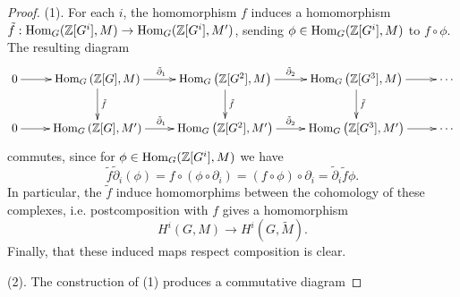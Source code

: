 \documentclass[11pt]{amsart}
\numberwithin{equation}{section}
\theoremstyle{remark}
\theoremstyle{remark}
\theoremstyle{remark}
\theoremstyle{definition}
\theoremstyle{definition}
\theoremstyle{definition}
\theoremstyle{definition}
\theoremstyle{definition}
\theoremstyle{definition}
\begin{document}
\begin{proof}
(1). For each $i$, the homomorphism $f$ induces a homomorphism $\tilde{f}:\textup{Hom}_G(\mathbb{Z}[G^i],M)\rightarrow \textup{Hom}_G(\mathbb{Z}[G^i],M')$, sending $\phi\in \textup{Hom}_G(\mathbb{Z}[G^i],M)$ to $f\circ \phi$. The resulting diagram 
\[
\xymatrix{0\ar[r]&\textup{Hom}_{G}\left(\mathbb{Z}[G],M\right)\ar[r]^{\tilde{\partial}_1}\ar[d]^{\tilde{f}}&\textup{Hom}_{G}\left(\mathbb{Z}[G^2],M\right)\ar[r]^{\tilde{\partial}_2}\ar[d]^{\tilde{f}}& \textup{Hom}_{G}\left(\mathbb{Z}[G^3],M\right)\ar[r]\ar[d]^{\tilde{f}}&\cdots \\ 0\ar[r]&\textup{Hom}_{G}\left(\mathbb{Z}[G],M'\right)\ar[r]^{\tilde{\partial}_1}&
\textup{Hom}_{G}\left(\mathbb{Z}[G^2],M'\right)\ar[r]^{\tilde{\partial}_2} &\textup{Hom}_{G}\left(\mathbb{Z}[G^3],M'\right)\ar[r]&\cdots}
\] 
commutes, since for $\phi \in \textup{Hom}_G(\mathbb{Z}[G^i],M)$ we have \[\tilde{f}\tilde{\partial}_i(\phi)=f\circ (\phi \circ \partial_i)=(f\circ \phi)\circ \partial_i=\tilde{\partial}_i\tilde{f}\phi.\]
In particular, the $\tilde{f}$ induce homomorphims between the cohomology of these complexes, i.e. postcomposition with $f$ gives a homomorphism
\[H^i(G,M)\rightarrow H^i(G,\tilde{M}).\]
Finally, that these induced maps respect composition is clear. 

(2). The construction of (1) produces a commutative diagram 


\end{proof}
\end{document}
